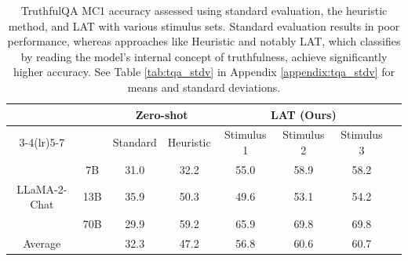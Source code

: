 \begin{table}[t]
\centering
\setlength{\tabcolsep}{3pt}
\begin{tabular}{*{8}{c}}
\toprule
& & \multicolumn{2}{c}{Zero-shot} & \multicolumn{3}{c}{LAT (Ours)} \\
\cmidrule(lr){3-4}\cmidrule(lr){5-7}
& & \multicolumn{1}{c}{Standard} & \multicolumn{1}{c}{Heuristic} & \multicolumn{1}{c}{Stimulus 1} & \multicolumn{1}{c}{Stimulus 2} & \multicolumn{1}{c}{Stimulus 3} \\
\midrule
& 7B & 31.0 & 32.2 & 55.0 & 58.9 & 58.2 \\
LLaMA-2-Chat & 13B & 35.9 & 50.3 & 49.6 & 53.1 & 54.2 \\
& 70B & 29.9 & 59.2 & 65.9 & 69.8 & 69.8 \\
\midrule
Average & & 32.3 & 47.2 & 56.8 & 60.6 & 60.7 \\
\bottomrule
\end{tabular}
\caption{TruthfulQA MC1 accuracy assessed using standard evaluation, the heuristic method, and LAT with various stimulus sets. Standard evaluation results in poor performance, whereas approaches like Heuristic and notably LAT, which classifies by reading the model's internal concept of truthfulness, achieve significantly higher accuracy. See Table \ref{tab:tqa_stdv} in Appendix \ref{appendix:tqa_stdv} for means and standard deviations.
}
\label{tab:tqa}

\end{table}










